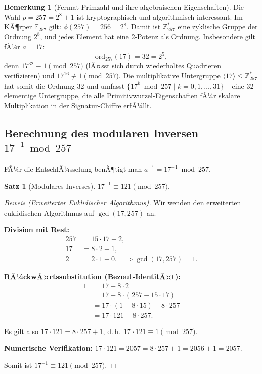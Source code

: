 ﻿\documentclass[a4paper,12pt]{scrreprt}
\theoremstyle{definition}
\newtheorem{bemerkung}{Bemerkung}[section]
\newtheorem{satz}{Satz}[section]
\begin{document}
\begin{bemerkung}[Fermat-Primzahl und ihre algebraischen Eigenschaften]
Die Wahl $p = 257 = 2^8 + 1$ ist kryptographisch und algorithmisch interessant. Im KÃ¶rper $\mathbb{F}_{257}$ gilt: $\phi(257) = 256 = 2^8$. Damit ist $\mathbb{Z}_{257}^*$ eine zyklische Gruppe der Ordnung $2^8$, und jedes Element hat eine 2-Potenz als Ordnung. Insbesondere gilt fÃ¼r $a = 17$:
\[
\mathrm{ord}_{257}(17) = 32 = 2^5,
\]
denn $17^{32} \equiv 1 \pmod{257}$ (lÃ¤sst sich durch wiederholtes Quadrieren verifizieren) und $17^{16} \not\equiv 1 \pmod{257}$. Die multiplikative Untergruppe $\langle 17 \rangle \leq \mathbb{Z}_{257}^*$ hat somit die Ordnung $32$ und umfasst $\{17^k \bmod 257 \mid k = 0, 1, \ldots, 31\}$ -- eine 32-elementige Untergruppe, die alle Primitivwurzel-Eigenschaften fÃ¼r skalare Multiplikation in der Signatur-Chiffre erfÃ¼llt.
\end{bemerkung}

\subsection{Berechnung des modularen Inversen $17^{-1} \bmod 257$}

FÃ¼r die EntschlÃ¼sselung benÃ¶tigt man $a^{-1} = 17^{-1} \bmod 257$.

\begin{satz}[Modulares Inverses]
\label{satz:modinv17}
$17^{-1} \equiv 121 \pmod{257}$.
\end{satz}

\begin{proof}[Beweis (Erweiterter Euklidischer Algorithmus)]
Wir wenden den erweiterten euklidischen Algorithmus auf $\gcd(17, 257)$ an.

\textbf{Division mit Rest:}
\begin{align*}
257 &= 15 \cdot 17 + 2, \\
17  &= 8 \cdot 2 + 1, \\
2   &= 2 \cdot 1 + 0. \quad \Rightarrow \gcd(17, 257) = 1.
\end{align*}

\textbf{RÃ¼ckwÃ¤rtssubstitution (Bezout-IdentitÃ¤t):}
\begin{align*}
1 &= 17 - 8 \cdot 2 \\
  &= 17 - 8 \cdot (257 - 15 \cdot 17) \\
  &= 17 \cdot (1 + 8 \cdot 15) - 8 \cdot 257 \\
  &= 17 \cdot 121 - 8 \cdot 257.
\end{align*}

Es gilt also $17 \cdot 121 = 8 \cdot 257 + 1$, d.\,h.\ $17 \cdot 121 \equiv 1 \pmod{257}$.

\textbf{Numerische Verifikation:}
$17 \cdot 121 = 2057 = 8 \cdot 257 + 1 = 2056 + 1 = 2057$. \checkmark

Somit ist $17^{-1} \equiv 121 \pmod{257}$.
\end{proof}
\end{document}
